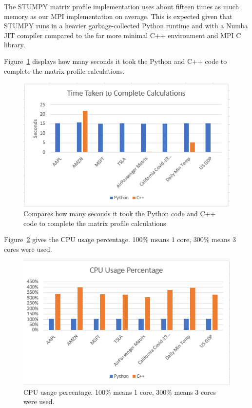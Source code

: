 \documentclass[conference]{IEEEtran}
\begin{document}
The STUMPY matrix profile implementation uses about fifteen times as much memory as our MPI implementation on average.  This is expected given that STUMPY runs in a heavier garbage-collected Python runtime and with a Numba JIT compiler compared to the far more minimal C++ environment and MPI C library.

Figure~\ref{fig:Time_Graph} displays how many seconds it took the Python and C++ code to complete the matrix profile calculations.

\begin{figure}
\begin{center}
\includegraphics[scale=1.05]{Time.png}
\caption{Compares how many seconds it took the Python code and C++ code to complete the matrix profile calculations}
\label{fig:Time_Graph}
\end{center}
\end{figure}

Figure~\ref{fig:CPU_Graph} gives the CPU usage percentage. 100\% means 1 core, 300\% means 3 cores were used.

\begin{figure}
\begin{center}
\includegraphics[scale=1.05]{CPU.png}
\caption{CPU usage percentage. 100\% means 1 core, 300\% means 3 cores were used.}
\label{fig:CPU_Graph}
\end{center}
\end{figure}
\end{document}
